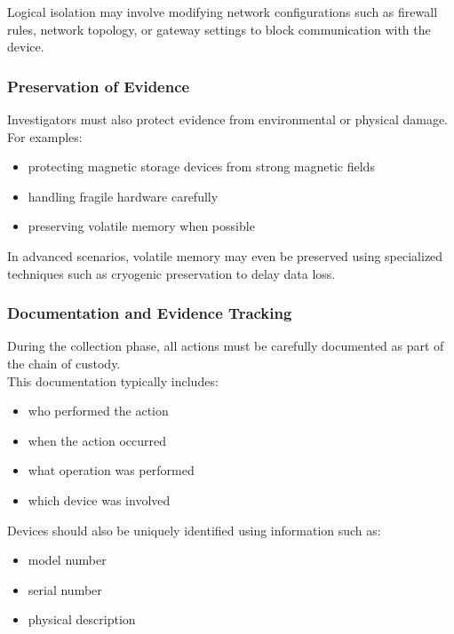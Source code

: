 \noindent
Logical isolation may involve modifying network configurations such as firewall rules, network topology, or gateway settings to block communication with the device.

\subsubsection{Preservation of Evidence}

Investigators must also protect evidence from environmental or physical damage.\\
For examples:

\begin{itemize}
\item protecting magnetic storage devices from strong magnetic fields
\item handling fragile hardware carefully
\item preserving volatile memory when possible
\end{itemize}

In advanced scenarios, volatile memory may even be preserved using specialized techniques such as cryogenic preservation to delay data loss.

\subsubsection{Documentation and Evidence Tracking}

During the collection phase, all actions must be carefully documented as part of the chain of custody.\\

\noindent
This documentation typically includes:

\begin{itemize}
\item who performed the action
\item when the action occurred
\item what operation was performed
\item which device was involved
\end{itemize}

\noindent
Devices should also be uniquely identified using information such as:

\begin{itemize}
\item model number
\item serial number
\item physical description
\end{itemize}

